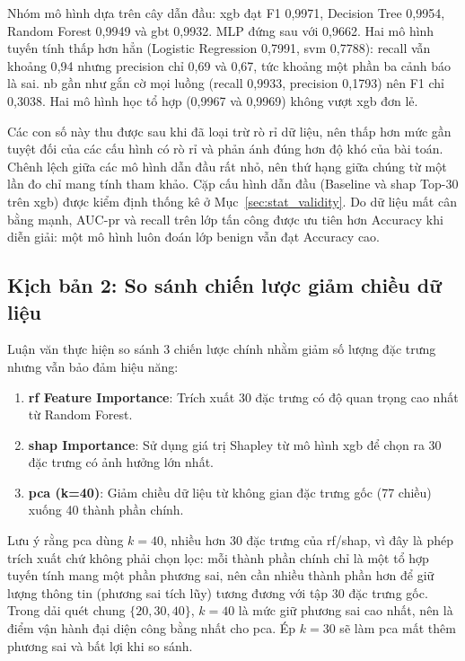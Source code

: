 Nhóm mô hình dựa trên cây dẫn đầu: \ac{xgb} đạt F1 0{,}9971, Decision Tree 0{,}9954, Random Forest 0{,}9949 và \ac{gbt} 0{,}9932. MLP đứng sau với 0{,}9662. Hai mô hình tuyến tính thấp hơn hẳn (Logistic Regression 0{,}7991, \ac{svm} 0{,}7788): recall vẫn khoảng 0{,}94 nhưng precision chỉ 0{,}69 và 0{,}67, tức khoảng một phần ba cảnh báo là sai. \ac{nb} gần như gắn cờ mọi luồng (recall 0{,}9933, precision 0{,}1793) nên F1 chỉ 0{,}3038. Hai mô hình học tổ hợp (0{,}9967 và 0{,}9969) không vượt \ac{xgb} đơn lẻ.

Các con số này thu được sau khi đã loại trừ rò rỉ dữ liệu, nên thấp hơn mức gần tuyệt đối của các cấu hình có rò rỉ và phản ánh đúng hơn độ khó của bài toán. Chênh lệch giữa các mô hình dẫn đầu rất nhỏ, nên thứ hạng giữa chúng từ một lần đo chỉ mang tính tham khảo. Cặp cấu hình dẫn đầu (Baseline và \ac{shap} Top-30 trên \ac{xgb}) được kiểm định thống kê ở Mục~\ref{sec:stat_validity}. Do dữ liệu mất cân bằng mạnh, AUC-\ac{pr} và recall trên lớp tấn công được ưu tiên hơn Accuracy khi diễn giải: một mô hình luôn đoán lớp benign vẫn đạt Accuracy cao.

\subsection{Kịch bản 2: So sánh chiến lược giảm chiều dữ liệu}
Luận văn thực hiện so sánh 3 chiến lược chính nhằm giảm số lượng đặc trưng nhưng vẫn bảo đảm hiệu năng:
\begin{enumerate}
    \item \textbf{\ac{rf} Feature Importance}: Trích xuất 30 đặc trưng có độ quan trọng cao nhất từ Random Forest.
    \item \textbf{\ac{shap} Importance}: Sử dụng giá trị Shapley từ mô hình \ac{xgb} để chọn ra 30 đặc trưng có ảnh hưởng lớn nhất.
    \item \textbf{\ac{pca} (k=40)}: Giảm chiều dữ liệu từ không gian đặc trưng gốc (77 chiều) xuống 40 thành phần chính.
\end{enumerate}

\noindent Lưu ý rằng \ac{pca} dùng $k=40$, nhiều hơn 30 đặc trưng của \ac{rf}/\ac{shap}, vì đây là phép trích xuất chứ không phải chọn lọc: mỗi thành phần chính chỉ là một tổ hợp tuyến tính mang một phần phương sai, nên cần nhiều thành phần hơn để giữ lượng thông tin (phương sai tích lũy) tương đương với tập 30 đặc trưng gốc. Trong dải quét chung $\{20,30,40\}$, $k=40$ là mức giữ phương sai cao nhất, nên là điểm vận hành đại diện công bằng nhất cho \ac{pca}. Ép $k=30$ sẽ làm \ac{pca} mất thêm phương sai và bất lợi khi so sánh.

